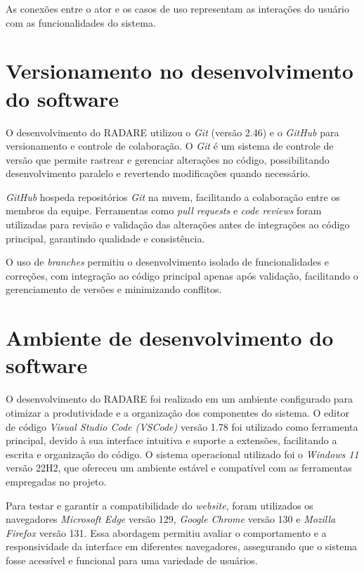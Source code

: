 As conexões entre o ator e os casos de uso representam as interações do usuário com as funcionalidades do sistema.

\section{Versionamento no desenvolvimento do software}

O desenvolvimento do RADARE utilizou o \textit{Git} (versão 2.46) e o \textit{GitHub} para versionamento e controle de colaboração. O \textit{Git} é um sistema de controle de versão que permite rastrear e gerenciar alterações no código, possibilitando desenvolvimento paralelo e revertendo modificações quando necessário.

\textit{GitHub} hospeda repositórios \textit{Git} na nuvem, facilitando a colaboração entre os membros da equipe. Ferramentas como \textit{pull requests} e \textit{code reviews} foram utilizadas para revisão e validação das alterações antes de integrações ao código principal, garantindo qualidade e consistência.

O uso de \textit{branches} permitiu o desenvolvimento isolado de funcionalidades e correções, com integração ao código principal apenas após validação, facilitando o gerenciamento de versões e minimizando conflitos.


\section{Ambiente de desenvolvimento do software}

O desenvolvimento do RADARE foi realizado em um ambiente configurado para otimizar a produtividade e a organização dos componentes do sistema. O editor de código \textit{Visual Studio Code (VSCode)} versão 1.78 foi utilizado como ferramenta principal, devido à sua interface intuitiva e suporte a extensões, facilitando a escrita e organização do código. O sistema operacional utilizado foi o \textit{Windows 11} versão 22H2, que ofereceu um ambiente estável e compatível com as ferramentas empregadas no projeto.

Para testar e garantir a compatibilidade do \textit{website}, foram utilizados os navegadores \textit{Microsoft Edge} versão 129, \textit{Google Chrome} versão 130 e \textit{Mozilla Firefox} versão 131. Essa abordagem permitiu avaliar o comportamento e a responsividade da interface em diferentes navegadores, assegurando que o sistema fosse acessível e funcional para uma variedade de usuários.

